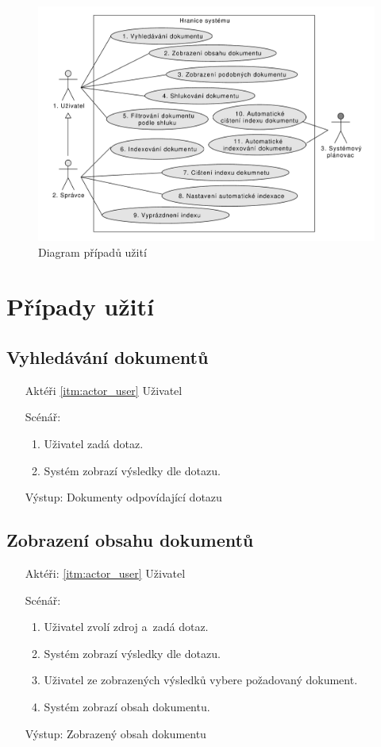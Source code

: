 \begin{figure}[h]
\begin{center}
\includegraphics[width=13cm]{UseCases}
\caption{Diagram případů užití}
\label{fig:UseCases}
\end{center}
\end{figure}

\section{Případy užití}

\subsection{Vyhledávání dokumentů}
\begin{itemize}
	\item[Aktéři] \ref{itm:actor_user} Uživatel
	\item[Scénář:]
	\begin{enumerate}
		\item Uživatel zadá dotaz.
		\item Systém zobrazí výsledky dle dotazu.
	\end{enumerate}
	\item[Výstup:] Dokumenty odpovídající dotazu
\end{itemize}

\subsection{Zobrazení obsahu dokumentů}
\begin{itemize}
	\item[Aktéři:] \ref{itm:actor_user} Uživatel
	\item[Scénář:]
	\begin{enumerate}
		\item Uživatel zvolí zdroj a~zadá dotaz.
		\item Systém zobrazí výsledky dle dotazu.
		\item Uživatel ze zobrazených výsledků vybere požadovaný dokument.
		\item Systém zobrazí obsah dokumentu.
	\end{enumerate}
	\item[Výstup:] Zobrazený obsah dokumentu
\end{itemize}

